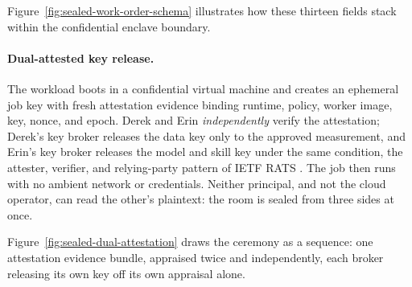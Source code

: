 \documentclass[11pt,a4paper]{article}
\theoremstyle{definition}
\begin{document}
Figure~\ref{fig:sealed-work-order-schema} illustrates how these thirteen
fields stack within the confidential enclave boundary.



\paragraph{Dual-attested key release.}
The workload boots in a confidential virtual machine and creates an ephemeral
job key with fresh attestation evidence binding runtime, policy, worker image,
key, nonce, and epoch. Derek and Erin \emph{independently} verify the
attestation; Derek's key broker releases the data key only to the approved
measurement, and Erin's key broker releases the model and skill key under the
same condition, the attester, verifier, and relying-party pattern of IETF RATS
. The job then runs with no ambient network or credentials. Neither
principal, and not the cloud operator, can read the other's plaintext: the room
is sealed from three sides at once.

Figure~\ref{fig:sealed-dual-attestation} draws the ceremony as a sequence:
one attestation evidence bundle, appraised twice and independently, each
broker releasing its own key off its own appraisal alone.


\end{document}
